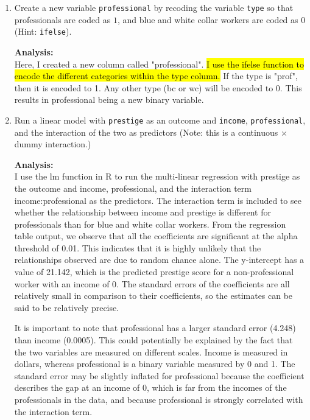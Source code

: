 \documentclass[12pt,letterpaper]{article}
\begin{document}
\begin{enumerate}
	
	\item [(a)]
	
	Create a new variable \texttt{professional} by recoding the variable \texttt{type} so that professionals are coded as $1$, and blue and white collar workers are coded as $0$ (Hint: \texttt{ifelse}).
	
	
	
	\textbf{Analysis:}\\
	Here, I created a new column called "professional". \hl{I use the ifelse function to encode the different categories within the type column.} If the type is "prof", then it is encoded to 1. Any other type (bc or wc) will be encoded to 0. This results in professional being a new binary variable. 
	
	\item [(b)]
	Run a linear model with \texttt{prestige} as an outcome and \texttt{income}, \texttt{professional}, and the interaction of the two as predictors (Note: this is a continuous $\times$ dummy interaction.)
	
	
	
	
	
	\textbf{Analysis:}\\
	I use the lm function in R to run the multi-linear regression with prestige as the outcome and income, professional, and the interaction term income:professional as the predictors. The interaction term is included to see whether the relationship between income and prestige is different for professionals than for blue and white collar workers. From the regression table output, we observe that all the coefficients are significant at the alpha threshold of 0.01. This indicates that it is highly unlikely that the relationships observed are due to random chance alone. The y-intercept has a value of 21.142, which is the predicted prestige score for a non-professional worker with an income of 0. The standard errors of the coefficients are all relatively small in comparison to their coefficients, so the estimates can be said to be relatively precise.
	
	It is important to note that professional has a larger standard error (4.248) than income (0.0005). This could potentially be explained by the fact that the two variables are measured on different scales. Income is measured in dollars, whereas professional is a binary variable measured by 0 and 1. The standard error may be slightly inflated for professional because the coefficient describes the gap at an income of 0, which is far from the incomes of the professionals in the data, and because professional is strongly correlated with the interaction term. 
	

\end{enumerate}
\end{document}

